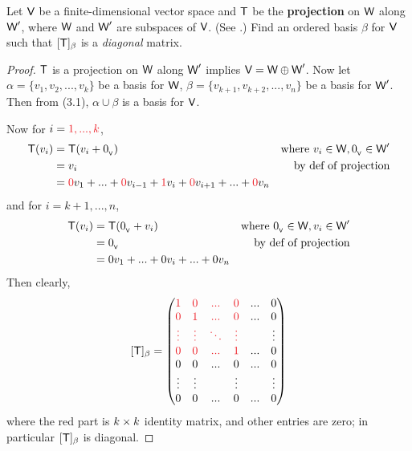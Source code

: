 \begin{exercise} \label{exercise 2.2.13}
Let \(\textsf{V}\) be a finite-dimensional vector space and \(\textsf{T}\) be the \textbf{projection} on \(\textsf{W}\) along \(\textsf{W}'\), where \(\textsf{W}\) and \(\textsf{W}'\) are subspaces of \(\textsf{V}\). (See .)
Find an ordered basis \(\beta\) for \(\textsf{V}\) such that \([\textsf{T}]_{\beta}\) is a \emph{diagonal} matrix.
\end{exercise}

\begin{proof}
\(\textsf{T}\) is a projection on \(\textsf{W}\) along \(\textsf{W}'\) implies \(\textsf{V} = \textsf{W} \oplus \textsf{W}'\).
Now let \(\alpha = \{ v_1, v_2, ..., v_k \}\) be a basis for \(\textsf{W}\), \(\beta = \{ v_{k + 1}, v_{k + 2}, ..., v_n \}\) be a basis for \(\textsf{W}'\).
Then from (3.1), \(\alpha \cup \beta\) is a basis for \(\textsf{V}\).

Now for \(i = \RED{1, ..., k}\),
\begin{align*}
    \T(v_i) & = \T(v_i + \OV) & \text{where \(v_i \in \W, \OV \in \W'\)} \\
            & = v_i & \text{by def of projection} \\
            & = \RED{0} v_1 + ... + \RED{0} v_{i - 1} + \RED{1} v_i + \RED{0} v_{i + 1} + ... + \RED{0} v_n
\end{align*}
and for \(i = k + 1, ..., n\),
\begin{align*}
    \textsf{T}(v_i) & = \textsf{T}(0_{_{\textsf{V}}} + v_i) & \text{where \(0_{_{\textsf{V}}}\in \textsf{W}, v_i \in \textsf{W}'\)} \\
            & = 0_{_{\textsf{V}}} & \text{by def of projection} \\
            & = 0 v_1 + ... + 0 v_i + ... + 0 v_n
\end{align*}
Then clearly,
\[
    [\T]_{\beta} = \begin{pmatrix}
    \RED{1} & \RED{0} & \RED{...} & \RED{0} & ... & 0 \\
    \RED{0} & \RED{1} & \RED{...} & \RED{0} & ... & 0 \\
    \RED{\vdots} & \RED{\vdots} & \RED{\ddots} & \RED{\vdots} & & \vdots \\
    \RED{0} & \RED{0} & \RED{...} & \RED{1} & ... & 0 \\
    0 & 0 & ... & 0 & ... & 0 \\
    \vdots & \vdots & & \vdots & & \vdots \\
    0 & 0 & ... & 0 & ... & 0
    \end{pmatrix}
\]
where the red part is \(k \times k\) identity matrix, and other entries are zero;
in particular \([\textsf{T}]_{\beta}\) is diagonal.
\end{proof}

